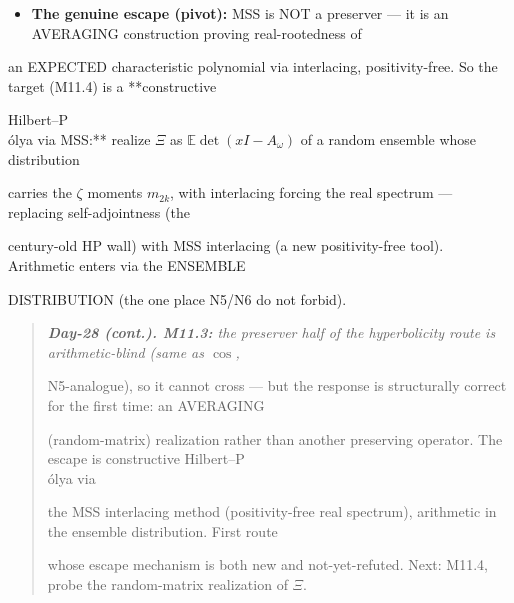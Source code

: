 \documentclass[10pt]{article}
\begin{document}
\begin{itemize}
\item \textbf{The genuine escape (pivot):} MSS is NOT a preserver --- it is an AVERAGING construction proving real-rootedness of
\end{itemize}
  an EXPECTED characteristic polynomial via interlacing, positivity-free. So the target (M11.4) is a **constructive\par
  Hilbert--P\\\'olya via MSS:** realize $\Xi$ as $\mathbb{E}\det(xI-A_\omega)$ of a random ensemble whose distribution\par
  carries the $\zeta$ moments $m_{2k}$, with interlacing forcing the real spectrum --- replacing self-adjointness (the\par
  century-old HP wall) with MSS interlacing (a new positivity-free tool). Arithmetic enters via the ENSEMBLE\par
  DISTRIBUTION (the one place N5/N6 do not forbid).\par

\begin{quote}\itshape
\textbf{Day-28 (cont.). M11.3:} the preserver half of the hyperbolicity route is arithmetic-blind (same as $\cos$,\par
N5-analogue), so it cannot cross --- but the response is structurally correct for the first time: an AVERAGING\par
(random-matrix) realization rather than another preserving operator. The escape is constructive Hilbert--P\\\'olya via\par
the MSS interlacing method (positivity-free real spectrum), arithmetic in the ensemble distribution. First route\par
whose escape mechanism is both new and not-yet-refuted. Next: M11.4, probe the random-matrix realization of $\Xi$.\par
\end{quote}
\end{document}

